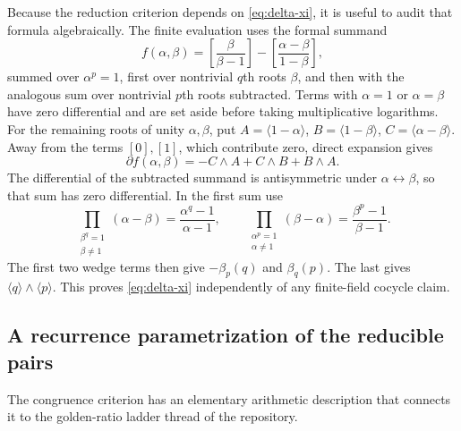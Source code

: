 \documentclass[11pt]{article}
\numberwithin{equation}{section}
\theoremstyle{definition}
\theoremstyle{remark}
\newcommand{\cl}[1]{\langle #1\rangle}
\begin{document}
Because the reduction criterion depends on \eqref{eq:delta-xi}, it is
useful to audit that formula algebraically. The finite evaluation uses
the formal summand
\[
 f(\alpha,\beta)=
 \left[\frac{\beta}{\beta-1}\right]
 -\left[\frac{\alpha-\beta}{1-\beta}\right],
\]
summed over $\alpha^p=1$, first over nontrivial $q$th roots $\beta$, and
then with the analogous sum over nontrivial $p$th roots subtracted.
Terms with $\alpha=1$ or $\alpha=\beta$ have zero differential and
are set aside before taking multiplicative logarithms. For the remaining
roots of unity $\alpha,\beta$, put
$A=\cl{1-\alpha}$, $B=\cl{1-\beta}$,
$C=\cl{\alpha-\beta}$. Away from the terms $[0],[1]$, which contribute
zero, direct expansion gives
\[
 \partial f(\alpha,\beta)=-C\wedge A+C\wedge B+B\wedge A.
\]
The differential of the subtracted summand is antisymmetric under
$\alpha\leftrightarrow\beta$, so that sum has zero differential.
In the first sum use
\[
 \prod_{\substack{\beta^q=1\\\beta\ne1}}(\alpha-\beta)
 =\frac{\alpha^q-1}{\alpha-1},\qquad
 \prod_{\substack{\alpha^p=1\\\alpha\ne1}}(\beta-\alpha)
 =\frac{\beta^p-1}{\beta-1}.
\]
The first two wedge terms then give $-\beta_p(q)$ and $\beta_q(p)$.
The last gives $\cl q\wedge\cl p$. This proves
\eqref{eq:delta-xi} independently of any finite-field cocycle claim.

\subsection{A recurrence parametrization of the reducible pairs}

The congruence criterion has an elementary arithmetic description that
connects it to the golden-ratio ladder thread of the repository.
\end{document}

